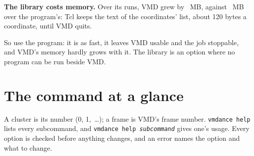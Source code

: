 \documentclass[11pt,letterpaper]{article}
\newcommand{\cmd}[1]{\texttt{#1}}
\newcommand{\meta}[1]{\textrm{\emph{#1}}}
\begin{document}
\textbf{The library costs memory.} Over its runs, VMD grew by \bnMemLib\ MB,
against \bnMemCli\ MB over the program's: Tcl keeps the text of the
coordinates' list, about 120 bytes a coordinate, until VMD quits.

So use the program: it is as fast, it leaves VMD usable and the job stoppable,
and VMD's memory hardly grows with it. The library is an option where no program
can be run beside VMD.

\section{The command at a glance}
\label{sec:command}

A cluster is its number (0, 1,~\ldots); a frame is VMD's frame number.
\cmd{vmdance help} lists every subcommand, and \cmd{vmdance help \meta{subcommand}} gives one's usage. Every option is checked before anything
changes, and an error names the option and what to change.
\end{document}
